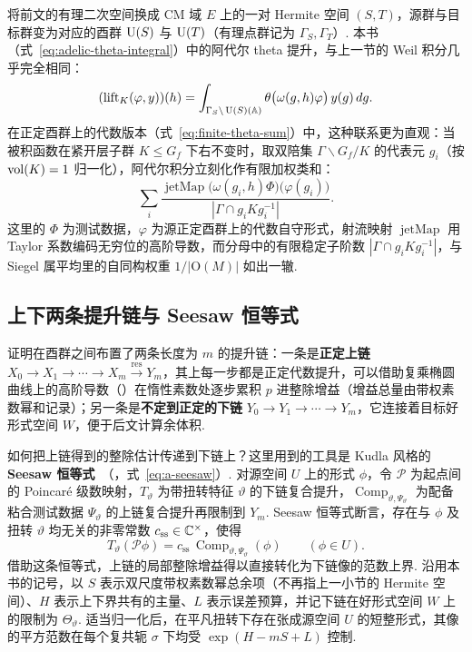 将前文的有理二次空间换成 CM 域 $E$ 上的一对 Hermite 空间 $(S,T)$，源群与目标群变为对应的酉群 $\operatorname{U}(S)$ 与 $\operatorname{U}(T)$（有理点群记为 $\Gamma_S,\Gamma_T$）. 本书（式~\eqref{eq:adelic-theta-integral}）中的阿代尔 theta 提升，与上一节的 Weil 积分几乎完全相同：
\[
(\operatorname{lift}_K(\varphi,y))(h)
=\int_{\Gamma_S\backslash \operatorname{U}(S)(\mathbb{A})}
  \theta\bigl(\omega(g,h)\varphi\bigr)\,y(g)\,dg.
\]
在正定酉群上的代数版本（式~\eqref{eq:finite-theta-sum}）中，这种联系更为直观：当被积函数在紧开层子群 $K\le G_f$ 下右不变时，取双陪集 $\Gamma\backslash G_f/K$ 的代表元 $g_i$（按 $\operatorname{vol}(K)=1$ 归一化），阿代尔积分立刻化作有限加权类和：
\[
\sum_i \frac{\operatorname{jetMap}\bigl(\omega(g_i,h)\Phi\bigr)\bigl(\varphi(g_i)\bigr)}{|\Gamma\cap g_i K g_i^{-1}|}.
\]
这里的 $\Phi$ 为测试数据，$\varphi$ 为源正定酉群上的代数自守形式，射流映射 $\operatorname{jetMap}$ 用 Taylor 系数编码无穷位的高阶导数，而分母中的有限稳定子阶数 $|\Gamma\cap g_i K g_i^{-1}|$，与 Siegel 属平均里的自同构权重 $1/|\mathrm O(M)|$ 如出一辙.

\subsection{上下两条提升链与 Seesaw 恒等式}

证明在酉群之间布置了两条长度为 $m$ 的提升链：一条是\textbf{正定上链} $X_0\to X_1\to\cdots\to X_m\xrightarrow{\operatorname{res}}Y_m$，其上每一步都是正定代数提升，可以借助复乘椭圆曲线上的高阶导数（）在惰性素数处逐步累积 $p$ 进整除增益（增益总量由带权素数幂和记录）；另一条是\textbf{不定到正定的下链} $Y_0\to Y_1\to\cdots\to Y_m$，它连接着目标好形式空间 $W$，便于后文计算余体积.

如何把上链得到的整除估计传递到下链上？这里用到的工具是 Kudla 风格的 \textbf{Seesaw 恒等式}~\cite{Kudla1984}（，式~\eqref{eq:a-seesaw}）. 对源空间 $U$ 上的形式 $\phi$，令 $\mathcal P$ 为起点间的 Poincaré 级数映射，$T_\vartheta$ 为带扭转特征 $\vartheta$ 的下链复合提升，$\operatorname{Comp}_{\vartheta,\Psi_\vartheta}$ 为配备粘合测试数据 $\Psi_\vartheta$ 的上链复合提升再限制到 $Y_m$. Seesaw 恒等式断言，存在与 $\phi$ 及扭转 $\vartheta$ 均无关的非零常数 $c_{\mathrm{ss}}\in\mathbb{C}^\times$，使得
\[
T_\vartheta(\mathcal P\phi)=c_{\mathrm{ss}}\,\operatorname{Comp}_{\vartheta,\Psi_\vartheta}(\phi)
\qquad (\phi\in U).
\]
借助这条恒等式，上链的局部整除增益得以直接转化为下链像的范数上界. 沿用本书的记号，以 $S$ 表示双尺度带权素数幂总余项（不再指上一小节的 Hermite 空间）、$H$ 表示上下界共有的主量、$L$ 表示误差预算，并记下链在好形式空间 $W$ 上的限制为 $\Theta_\vartheta$. 适当归一化后，在平凡扭转下存在张成源空间 $U$ 的短整形式，其像的平方范数在每个复共轭 $\sigma$ 下均受 $\exp(H-mS+L)$ 控制.

